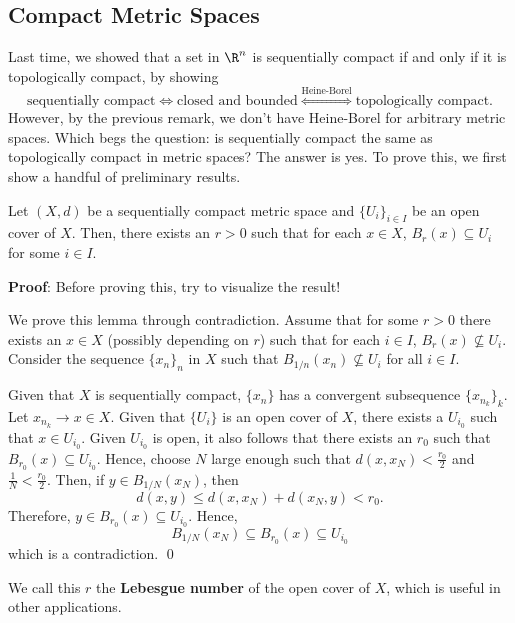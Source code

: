 
\subsection*{Compact Metric Spaces}

Last time, we showed that a set in $\R^n$ is sequentially compact if and only if it is topologically compact, by showing 
\[
\text{sequentially compact} \iff \text{closed and bounded} \stackrel{\text{Heine-Borel}}{\iff} \text{topologically compact}.
\]
However, by the previous remark, we don't have Heine-Borel for arbitrary metric spaces. Which begs the question: is sequentially compact the same as topologically compact in metric spaces? The answer is yes. To prove this, we first show a handful of preliminary results.

\begin{lemma}
Let $(X,d)$ be a sequentially compact metric space and $\{U_i\}_{i\in I}$ be an open cover of $X$. Then, there exists an $r>0$ such that for each $x\in X$, $B_r(x)\subseteq U_i$ for some $i\in I$.
\end{lemma}
\textbf{Proof}: Before proving this, try to visualize the result!

We prove this lemma through contradiction. Assume that for some $r>0$ there exists an $x\in X$ (possibly depending on $r$) such that for each $i\in I$, $B_r(x)\not\subseteq U_i.$ Consider the sequence $\{x_n\}_n$ in $X$ such that $B_{1/n}(x_n) \not\subseteq U_i$ for all $i\in I.$

Given that $X$ is sequentially compact, $\{x_n\}$ has a convergent subsequence $\{x_{n_k}\}_k$. Let $x_{n_k}\to x\in X$. Given that $\{U_i\}$ is an open cover of $X$, there exists a $U_{i_0}$ such that $x\in U_{i_0}$. Given $U_{i_0}$ is open, it also follows that there exists an $r_0$ such that $B_{r_0}(x) \subseteq U_{i_0}$. Hence, choose $N$ large enough such that $d(x,x_N) < \frac{r_0}{2}$ and $\frac{1}{N}< \frac{r_0}{2}$. Then, if $y\in B_{1/N}(x_N)$, then 
\[d(x,y) \leq  d(x,x_N) + d(x_N, y) <r_0.\]
Therefore, $y\in B_{r_0}(x) \subseteq U_{i_0}$. Hence,
\[
B_{1/N}(x_N) \subseteq B_{r_0} (x) \subseteq U_{i_0}
\]
which is a contradiction. \qed 

We call this $r$ the \textbf{Lebesgue number} of the open cover of $X$, which is useful in other applications.

